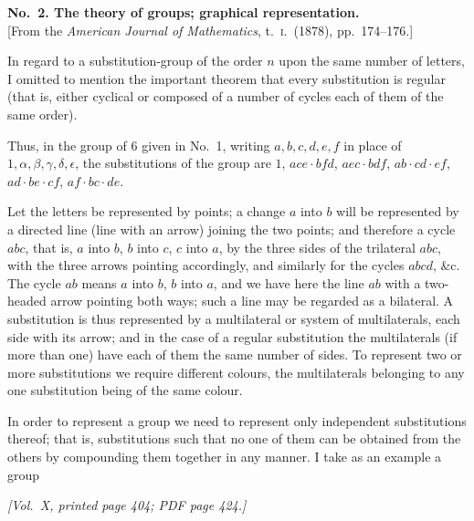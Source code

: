 \documentclass[11pt]{article}
\begin{document}
\bigskip

\begin{center}
\textbf{No.~2. The theory of groups; graphical representation.}\\[4pt]
\small [From the \textit{American Journal of Mathematics}, t.~\textsc{i}.\ (1878), pp.~174--176.]
\end{center}

\medskip

In regard to a substitution-group of the order $n$ upon the same number of letters, I omitted to mention the important theorem that every substitution is regular (that is, either cyclical or composed of a number of cycles each of them of the same order).

\medskip

Thus, in the group of $6$ given in No.~1, writing $a, b, c, d, e, f$ in place of $1, \alpha, \beta, \gamma, \delta, \epsilon$, the substitutions of the group are $1$, $ace\cdot bfd$, $aec\cdot bdf$, $ab\cdot cd\cdot ef$, $ad\cdot be\cdot cf$, $af\cdot bc\cdot de$.

\medskip

Let the letters be represented by points; a change $a$ into $b$ will be represented by a directed line (line with an arrow) joining the two points; and therefore a cycle $abc$, that is, $a$ into $b$, $b$ into $c$, $c$ into $a$, by the three sides of the trilateral $abc$, with the three arrows pointing accordingly, and similarly for the cycles $abcd$, \&c. The cycle $ab$ means $a$ into $b$, $b$ into $a$, and we have here the line $ab$ with a two-headed arrow pointing both ways; such a line may be regarded as a bilateral. A substitution is thus represented by a multilateral or system of multilaterals, each side with its arrow; and in the case of a regular substitution the multilaterals (if more than one) have each of them the same number of sides. To represent two or more substitutions we require different colours, the multilaterals belonging to any one substitution being of the same colour.

\medskip

In order to represent a group we need to represent only independent substitutions thereof; that is, substitutions such that no one of them can be obtained from the others by compounding them together in any manner. I take as an example a group

\newpage

\noindent\textit{[Vol.~X, printed page 404; PDF page 424.]}

\medskip
\end{document}
